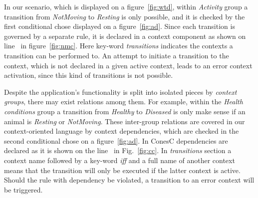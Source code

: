 
In our scenario, which is displayed on a figure~\ref{fig:wtd}, within \emph{Activity} group a
transition from \emph{NotMoving} to \emph{Resting} is only possible, and it is checked
by the first conditional chose displayed on a figure~\ref{fig:ad}.
Since each transition is governed by a separate rule, it is declared in a context component as shown
on line~ in figure~\ref{fig:nmc}. Here key-word \emph{transitions}
indicates the contexts a transition can be performed to. An attempt to initiate
a transition to the context, which is not declared in a given active context, leads to an error context
activation, since this kind of transitions is not possible.


Despite the application's  functionality is split into isolated pieces by \emph{context groups},
there may exist relations among them. For example, within the 
\emph{Health conditions} group a transition from \emph{Healthy} to \emph{Diseased} is only
make sense if an animal is \emph{Resting} or \emph{NotMoving}. These inter-group
relations are covered in our context-oriented language by context dependencies,
which are checked in the second conditional chose on a figure~\ref{fig:ad}. In
ConesC dependencies are declared as it is shown on the line~
in Fig.~\ref{fig:cc}. In \emph{transitions} section a context name followed by a
key-word \emph{iff} and a full name of another context means that
the transition will only be executed if the latter context is active. Should the
rule with dependency be violated, a transition to an error context will be triggered.

